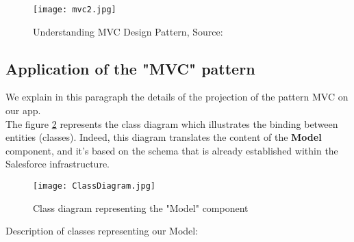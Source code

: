 \begin{figure}[H]%
    \center   
    \texttt{[image: mvc2.jpg]}
    \caption{Understanding MVC Design Pattern, Source: \cite{7}}
    \label{mvc}
\end{figure}
\subsection{Application of the "MVC" pattern}
We explain in this paragraph the details of the projection of the pattern
MVC on our app.\\
The figure \ref{classdiagram} represents the class diagram which illustrates the binding
between entities (classes). Indeed, this diagram translates the content of the \textbf{Model} component, and it's based on the schema that is already established within the Salesforce infrastructure.
\begin{figure}[H]%
    \center   
    \texttt{[image: ClassDiagram.jpg]}
    \caption{Class diagram representing the "Model" component}
    \label{classdiagram}
\end{figure}
\newpage
Description of classes representing our Model:
